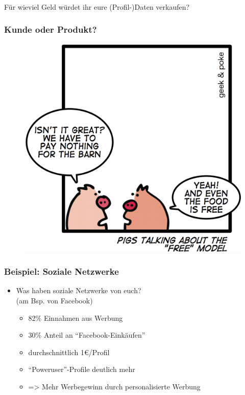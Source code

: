 \documentclass[12pt]{beamer}
\begin{document}
\begin{frame}
\begin{frame}
  \frametitle{}
  \begin{center} \Large
   Für wieviel Geld würdet ihr eure (Profil-)Daten verkaufen?
  \end{center}
\end{frame}


\begin{frame}
  \frametitle{Kunde oder Produkt?}
  \begin{figure}
    \includegraphics[height=0.7\textheight]{img/business_pigs.jpg}
  \end{figure}
\end{frame}

\begin{frame}
  \frametitle{Beispiel: Soziale Netzwerke}

  \begin{itemize}
    \item Was haben soziale Netzwerke von euch?\\(am Bsp. von Facebook)
      \begin{itemize}
        \item<2-> 82\% Einnahmen aus Werbung
        \item<3-> 30\% Anteil an "`Facebook-Einkäufen"'
        \item<4-> durchschnittlich 1€/Profil
        \item<5-> "`Poweruser"'-Profile deutlich mehr
        \item<6-> => Mehr Werbegewinn durch personalisierte Werbung
      \end{itemize}
  \end{itemize}
\end{frame}


\end{frame}
\end{document}

